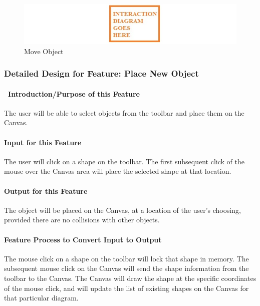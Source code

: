 \documentclass[twoside,letterpaper]{article}
\begin{document}
{{}
\bigskip

\begin{figure}[h]
\centering
\includegraphics[width=6.0in]{temp.jpg}
\caption{ Move Object }
\end{figure}

\clearpage



% 
%

\subsubsection{Detailed Design for Feature: Place New Object }
\paragraph[\ Introduction/Purpose of this Feature]
{\ Introduction/Purpose of this Feature}
{
The user will be able to select objects from the toolbar and place them on the Canvas.
}

\paragraph[Input for this Feature]{Input for this Feature}
{
The user will click on a shape on the toolbar.  The first subsequent click of the mouse over the Canvas area will place the selected shape at that location.
}

\paragraph{Output for this Feature}
{
The object will be placed on the Canvas, at a location of the user{\textquoteright}s choosing, provided there are no collisions with other objects.
}

\paragraph{Feature Process to Convert Input to Output}
{
The mouse click on a shape on the toolbar will lock that shape in memory.
The subsequent mouse click on the Canvas will send the shape information from the toolbar to the Canvas.  
The Canvas will draw the shape at the specific coordinates of the mouse click, and will update the list of existing shapes on the Canvas for that particular diagram.
}

}
\end{document}
